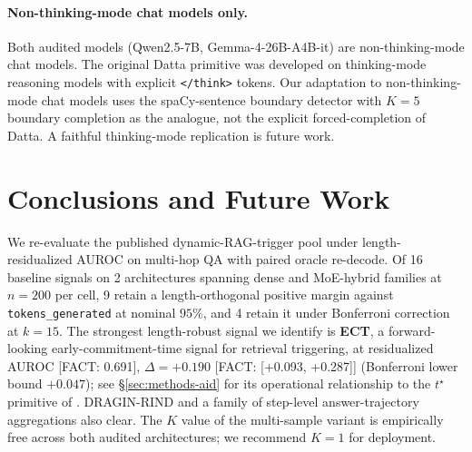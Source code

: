 \documentclass[11pt]{article}
\newcommand{\FACT}[1]{{\color{blue}\textsf{[FACT: #1]}}}
\begin{document}
\paragraph{Non-thinking-mode chat models only.} Both audited models
(Qwen2.5-7B, Gemma-4-26B-A4B-it) are non-thinking-mode chat
models. The original Datta primitive
\citep{Datta_DecideEarlyExplainLater} was developed on thinking-mode
reasoning models with explicit \texttt{</think>} tokens. Our adaptation to
non-thinking-mode chat models uses the spaCy-sentence boundary detector with
$K{=}5$ boundary completion as the analogue, not the explicit
forced-completion of Datta. A faithful thinking-mode replication is future
work.


\section{Conclusions and Future Work}
\label{sec:conclusion}
\label{sec:future-work}

We re-evaluate the published dynamic-RAG-trigger pool under
length-residualized AUROC on multi-hop QA with paired oracle re-decode.
Of 16 baseline signals on 2 architectures spanning dense and MoE-hybrid
families at $n{=}200$ per cell, 9 retain a length-orthogonal positive
margin against \texttt{tokens\_generated} at nominal $95\%$, and 4 retain
it under Bonferroni correction at $k{=}15$. The strongest length-robust
signal we identify is \textbf{ECT}, a forward-looking
early-commitment-time signal for retrieval triggering, at residualized
AUROC \FACT{0.691}, $\Delta = +0.190$ \FACT{[+0.093, +0.287]} (Bonferroni
lower bound $+0.047$); see \S\ref{sec:methods-aid} for its operational
relationship to the $t^\star$ primitive of
\citet{Datta_DecideEarlyExplainLater}. DRAGIN-RIND \citep{Su_DRAGIN} and
a family of step-level answer-trajectory aggregations also clear. The
$K$ value of the multi-sample variant is empirically free across both
audited architectures; we recommend $K{=}1$ for deployment.
\end{document}
